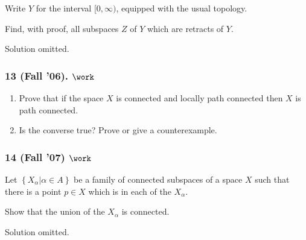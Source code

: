 \begin{problem}[Spring 2006, 12]

Write \(Y\) for the interval \([0, \infty)\), equipped with the usual
topology.

Find, with proof, all subspaces \(Z\) of \(Y\) which are retracts of
\(Y\).

\end{problem}


Solution omitted.

\hypertarget{fall-06.-work-1}{%
\subsubsection{\texorpdfstring{13 (Fall '06).
\(\work\)}{13 (Fall '06). \textbackslash work}}\label{fall-06.-work-1}}

\begin{problem}[Fall 2006, 13]

\envlist

\begin{enumerate}
\def\labelenumi{\alph{enumi}.}
\item
  Prove that if the space \(X\) is connected and locally path connected
  then \(X\) is path connected.
\item
  Is the converse true? Prove or give a counterexample.
\end{enumerate}

\end{problem}

\hypertarget{fall-07-work}{%
\subsubsection{\texorpdfstring{14 (Fall '07)
\(\work\)}{14 (Fall '07) \textbackslash work}}\label{fall-07-work}}

\begin{problem}[?]

Let \(\left\{{X_\alpha \mathrel{\Big|}\alpha \in A}\right\}\) be a
family of connected subspaces of a space \(X\) such that there is a
point \(p \in X\) which is in each of the \(X_\alpha\).

Show that the union of the \(X_\alpha\) is connected.

\end{problem}


Solution omitted.

